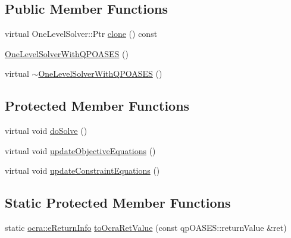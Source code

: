 \subsection*{Public Member Functions}
\begin{DoxyCompactItemize}
\item 
virtual One\+Level\+Solver\+::\+Ptr \hyperlink{classocra_1_1OneLevelSolverWithQPOASES_ac92f5e6885ada1f68b2f3b31cacf43f5}{clone} () const
\item 
\hyperlink{classocra_1_1OneLevelSolverWithQPOASES_a5540c732d87204ed0779b3fbaa5667b7}{One\+Level\+Solver\+With\+Q\+P\+O\+A\+S\+ES} ()
\item 
virtual \hyperlink{classocra_1_1OneLevelSolverWithQPOASES_adf42bcbdf5c169be4fe51c025ed49c53}{$\sim$\+One\+Level\+Solver\+With\+Q\+P\+O\+A\+S\+ES} ()
\end{DoxyCompactItemize}
\subsection*{Protected Member Functions}
\begin{DoxyCompactItemize}
\item 
virtual void \hyperlink{classocra_1_1OneLevelSolverWithQPOASES_aa2d1343a6e0f5c8913496c3384c0cd40}{do\+Solve} ()
\item 
virtual void \hyperlink{classocra_1_1OneLevelSolverWithQPOASES_a6a0e2cdfe22731fde09af26442a9cc85}{update\+Objective\+Equations} ()
\item 
virtual void \hyperlink{classocra_1_1OneLevelSolverWithQPOASES_abbe458ba193d545d6c07b09f582d6ce7}{update\+Constraint\+Equations} ()
\end{DoxyCompactItemize}
\subsection*{Static Protected Member Functions}
\begin{DoxyCompactItemize}
\item 
static \hyperlink{namespaceocra_aa1d873ac30cb0a0f79ba978745de294b}{ocra\+::e\+Return\+Info} \hyperlink{classocra_1_1OneLevelSolverWithQPOASES_a8fa99c1dbded56a7ecc69a3d756f1277}{to\+Ocra\+Ret\+Value} (const qp\+O\+A\+S\+E\+S\+::return\+Value \&ret)
\end{DoxyCompactItemize}
